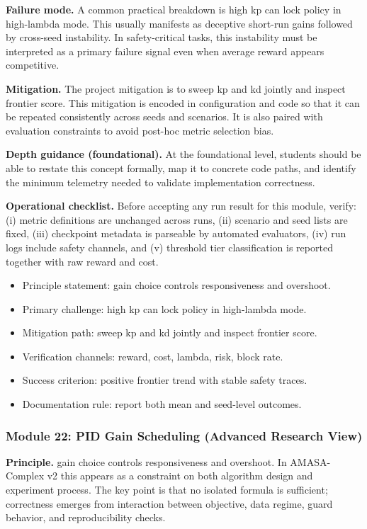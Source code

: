 \documentclass[conference]{IEEEtran}
\begin{document}
\textbf{Failure mode.} A common practical breakdown is high kp can lock policy in high-lambda mode. This usually manifests as deceptive short-run gains followed by cross-seed instability. In safety-critical tasks, this instability must be interpreted as a primary failure signal even when average reward appears competitive.

\textbf{Mitigation.} The project mitigation is to sweep kp and kd jointly and inspect frontier score. This mitigation is encoded in configuration and code so that it can be repeated consistently across seeds and scenarios. It is also paired with evaluation constraints to avoid post-hoc metric selection bias.

\textbf{Depth guidance (foundational).} At the foundational level, students should be able to restate this concept formally, map it to concrete code paths, and identify the minimum telemetry needed to validate implementation correctness.

\textbf{Operational checklist.} Before accepting any run result for this module, verify: (i) metric definitions are unchanged across runs, (ii) scenario and seed lists are fixed, (iii) checkpoint metadata is parseable by automated evaluators, (iv) run logs include safety channels, and (v) threshold tier classification is reported together with raw reward and cost.

\begin{itemize}[leftmargin=*]
  \item Principle statement: gain choice controls responsiveness and overshoot.
  \item Primary challenge: high kp can lock policy in high-lambda mode.
  \item Mitigation path: sweep kp and kd jointly and inspect frontier score.
  \item Verification channels: reward, cost, lambda, risk, block rate.
  \item Success criterion: positive frontier trend with stable safety traces.
  \item Documentation rule: report both mean and seed-level outcomes.
\end{itemize}


\subsubsection{Module 22: PID Gain Scheduling (Advanced Research View)}
\textbf{Principle.} gain choice controls responsiveness and overshoot. In AMASA-Complex v2 this appears as a constraint on both algorithm design and experiment process. The key point is that no isolated formula is sufficient; correctness emerges from interaction between objective, data regime, guard behavior, and reproducibility checks.
\end{document}
